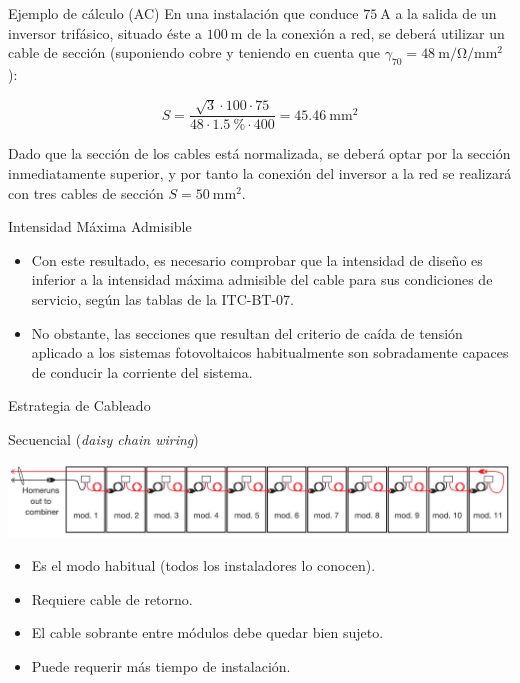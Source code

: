 \documentclass[aspectratio=169, usenames,svgnames,dvipsnames]{beamer}
\begin{document}
\begin{frame}[label={sec:org73dcdc8}]{Ejemplo de cálculo (AC)}
En una instalación que conduce \(\qty{75}{\ampere}\) a la salida de un
inversor trifásico, situado éste a \(\qty{100}{\meter}\) de la conexión
a red, se deberá utilizar un cable de sección (suponiendo cobre y
teniendo en cuenta que \(\gamma_{70} =
\qty{48}{\meter\per\ohm\per\milli\meter\squared}\)):


\[
  S=\frac{\sqrt{3} \cdot 100 \cdot 75}{48 \cdot \qty{1.5}{\percent}\cdot400}=\qty{45.46}{\milli\meter\squared}
\]

Dado que la sección de los cables está normalizada, se deberá optar
por la sección inmediatamente superior, y por tanto la conexión del
inversor a la red se realizará con tres cables de sección
\(S=\qty{50}{\milli\meter\squared}\).
\end{frame}
\begin{frame}[label={sec:orgd626270}]{Intensidad Máxima Admisible}
\begin{itemize}
\item Con este resultado, es necesario comprobar que la intensidad de diseño es inferior a la intensidad máxima admisible del cable para sus condiciones de servicio, según las tablas de la ITC-BT-07.
\end{itemize}

\vfill

\begin{itemize}
\item No obstante, las secciones que resultan del criterio de caída de tensión aplicado a los sistemas fotovoltaicos habitualmente son sobradamente capaces de conducir la corriente del sistema.
\end{itemize}
\end{frame}
\begin{frame}[label={sec:orgc9cd192}]{Estrategia de Cableado}
\begin{block}{Secuencial (\emph{daisy chain wiring})}
\begin{center}
\includegraphics[width=\textwidth]{../figs/DaisyChainWiring.png}
\end{center}

\begin{itemize}
\item Es el modo habitual (todos los instaladores lo conocen).
\item Requiere cable de retorno.
\item El cable sobrante entre módulos debe quedar bien sujeto.
\item Puede requerir más tiempo de instalación.
\end{itemize}
\end{block}
\end{frame}
\end{document}
